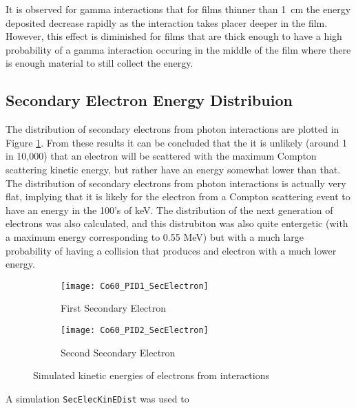 It is observed for gamma interactions that for films thinner than \SI{1}{\cm} the energy deposited decrease rapidly as the interaction takes placer deeper in the film.
However, this effect is diminished for films that are thick enough to have a high probability of a gamma interaction occuring in the middle of the film where there is enough material to still collect the energy.
\subsection{Secondary Electron Energy Distribuion}

The distribution of secondary electrons from photon interactions are plotted in Figure \ref{fig:SecElecKinEDist}.
From these results it can be concluded that the it is unlikely (around 1 in 10,000) that an electron will be scattered with the maximum Compton scattering kinetic energy, but rather have an energy somewhat lower than that.
The distribution of secondary electrons from photon interactions is actually very flat, implying that it is likely for the electron from a Compton scattering event to have an energy in the 100's of keV.
The distribution of the next generation of electrons was also calculated, and this distrubiton was also quite entergetic (with a maximum energy corresponding to 0.55 MeV) but with a much large probability of having a collision that produces and electron with a much lower energy.
\begin{figure}[h]
    \centering
    \begin{subfigure}[b]{0.45\figurewidth}
        \texttt{[image: Co60\_PID1\_SecElectron]}
        \caption{First Secondary Electron}
    \end{subfigure}
    \begin{subfigure}[b]{0.45\figurewidth}
        \texttt{[image: Co60\_PID2\_SecElectron]}
        \caption{Second Secondary Electron}
    \end{subfigure}
    \caption{Simulated kinetic energies of electrons from  interactions}
    \label{fig:SecElecKinEDist}
\end{figure}

A simulation \verb+SecElecKinEDist+ was used to 
